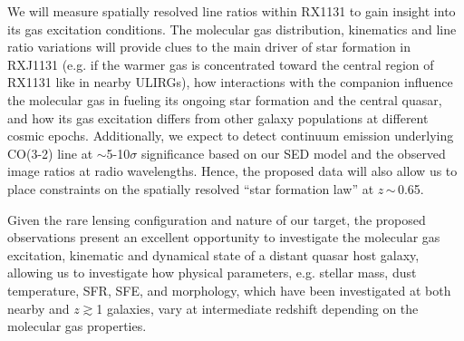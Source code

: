 \documentclass[11pt,a4paper,twoside,graphicx,color]{article}
\newcommand{\bco}{\mbox{CO(2-1)}\xspace}
\newcommand{\cco}{\mbox{CO(3-2)}\xspace}
\newcommand{\ssim}{\,$\sim$\,}
\newcommand{\SF}{star formation\xspace}
\newcommand{\galpop}{galaxy populations\xspace}
\newcommand{\atinterz}{at intermediate redshift\xspace}
\begin{document}
%
We will measure spatially resolved line ratios %
within RX1131 to gain insight into its gas excitation conditions.
The molecular gas distribution, kinematics and line ratio variations will provide clues to
the main driver of \SF in RXJ1131 (e.g. if the warmer gas is
concentrated toward the central region of RX1131 like in nearby ULIRGs), 
how interactions with the companion influence the molecular gas 
in fueling its ongoing \SF and the central quasar,
and how its gas excitation differs from other \galpop at different cosmic epochs.
%
%
Additionally, we expect to detect continuum emission underlying \cco line at $\sim$5-10$\sigma$ significance
based on our SED model and the observed image ratios at radio wavelengths.
Hence, the proposed data will also allow us to place constraints on the spatially resolved 
``\SF law'' at $z$\ssim0.65.

Given the rare lensing configuration and nature of our target, the proposed observations 
present an excellent opportunity to investigate the molecular gas excitation, kinematic and dynamical 
state of a distant quasar host galaxy, allowing 
us to investigate how physical parameters, e.g. stellar mass, dust temperature, SFR, SFE, and morphology, which have been investigated at both nearby and $z$$\gtrsim$1 galaxies, vary \atinterz depending on the molecular gas 
properties. %

\end{document}
